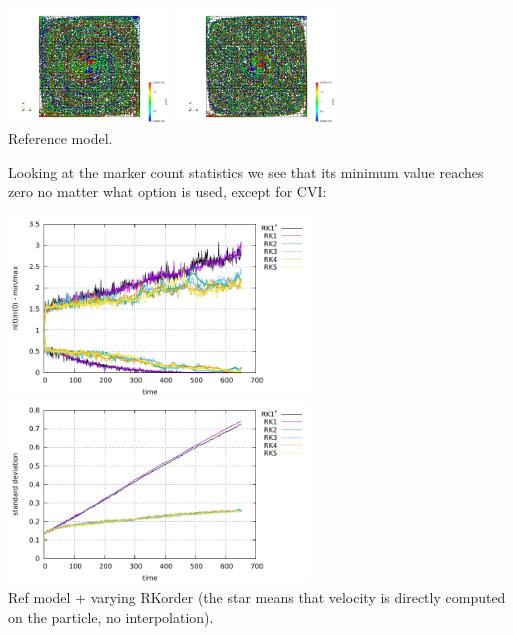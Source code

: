 \begin{center}
\includegraphics[width=4.3cm]{python_codes/fieldstone_30/results_dh/mmm0040}
\includegraphics[width=4.3cm]{python_codes/fieldstone_30/results_dh/mmm0070}\\
{\captionfont Reference model.}
\end{center}

Looking at the marker count statistics we see that its minimum value reaches zero no 
matter what option is used, except for CVI: 

\begin{center}
\includegraphics[width=8cm]{python_codes/fieldstone_30/results_dh/markercount_rk12345}
\includegraphics[width=8cm]{python_codes/fieldstone_30/results_dh/stdev_rk12345}\\
{\captionfont Ref model + varying RKorder (the star means that velocity 
is directly computed on the particle, no interpolation).}
\end{center} 

